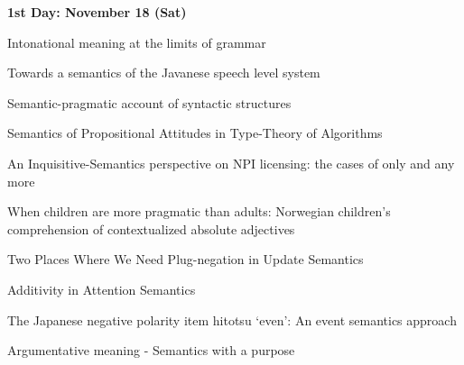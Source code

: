 \documentclass[12pt]{jarticle}
\begin{document}
\noindent\textbf{\large 
1st Day: November 18 (Sat)
}\\










  
      {Intonational meaning at the limits of grammar}
      {}
  
      {Towards a semantics of the Javanese speech level system}
      {}
  
      {Semantic-pragmatic account of syntactic structures}
      {}



 
  
      {Semantics of Propositional Attitudes in Type-Theory of Algorithms}
      {}
  
      {An Inquisitive-Semantics perspective on NPI licensing: the cases of only and any more}
      {}
  
      {When children are more pragmatic than adults: Norwegian children’s comprehension of contextualized absolute adjectives}
      {}






 
  
      {Two Places Where We Need Plug-negation in Update Semantics}
      {}
  
      {Additivity in Attention Semantics}
      {}
  
      {The Japanese negative polarity item hitotsu ‘even’: An event semantics approach}
      {}







  
      {Argumentative meaning - Semantics with a purpose}
      {}
\end{document}
